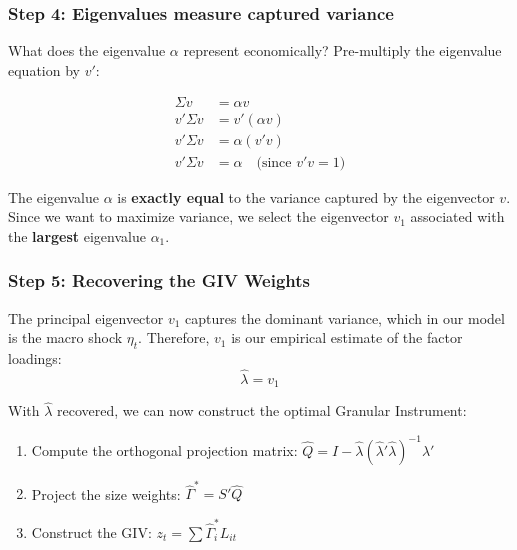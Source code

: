 \documentclass[aspectratio=169,11pt]{beamer}
\begin{document}
\begin{frame}
    \frametitle{Step 4: Eigenvalues measure captured variance}
    
    \vspace{0.5cm}
    What does the eigenvalue $\alpha$ represent economically? Pre-multiply the eigenvalue equation by $v'$:
    
    \begin{align*}
        \Sigma v &= \alpha v \\
        v' \Sigma v &= v' (\alpha v) \\
        v' \Sigma v &= \alpha (v'v) \\
        v' \Sigma v &= \alpha \quad \text{(since } v'v = 1\text{)}
    \end{align*}
    
    \vspace{0.5cm}
    The eigenvalue $\alpha$ is \textbf{exactly equal} to the variance captured by the eigenvector $v$. Since we want to maximize variance, we select the eigenvector $v_1$ associated with the \textbf{largest} eigenvalue $\alpha_1$.
\end{frame}

\begin{frame}
    \frametitle{Step 5: Recovering the GIV Weights}
    
    \vspace{0.5cm}
    The principal eigenvector $v_1$ captures the dominant variance, which in our model is the macro shock $\eta_t$. Therefore, $v_1$ is our empirical estimate of the factor loadings:
    \begin{equation*}
        \hat{\lambda} = v_1
    \end{equation*}
    
    \vspace{0.5cm}
    With $\hat{\lambda}$ recovered, we can now construct the optimal Granular Instrument:
    \begin{enumerate}
        \item Compute the orthogonal projection matrix: $\hat{Q} = I - \hat{\lambda}(\hat{\lambda}'\hat{\lambda})^{-1}\hat{\lambda}'$
        \item Project the size weights: $\hat{\Gamma}^* = S'\hat{Q}$
        \item Construct the GIV: $z_t = \sum \hat{\Gamma}^*_i L_{it}$
    \end{enumerate}
\end{frame}
\end{document}
